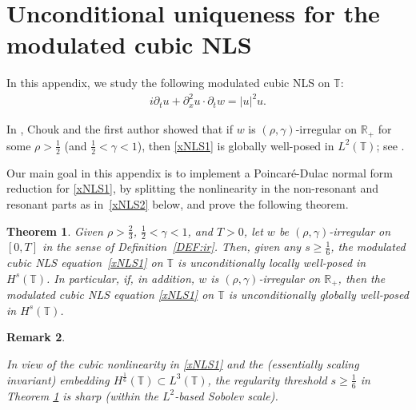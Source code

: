 \documentclass[letterpaper, 11pt,  reqno]{amsart}
\newtheorem{theorem}{Theorem} [section]
\newtheorem{remark}[theorem]{Remark}
\newcommand{\1}{\hspace{0.5mm}\text{I}\hspace{0.5mm}}
\newcommand{\noi}{\noindent}
\newcommand{\R}{\mathbb{R}}
\newcommand{\T}{\mathbb{T}}
\newcommand{\g}{\gamma}
\newcommand{\dx}{\partial_x}
\newcommand{\dt}{\partial_t}
\numberwithin{equation}{section}
\numberwithin{theorem}{section}
\begin{document}
\appendix

\section{Unconditional uniqueness for the  modulated cubic NLS} 
\label{SEC:A}

In this appendix, we study  the 
 following modulated cubic NLS on $\T$:
\begin{align}
i \dt u + \dx^2 u \cdot \dt w= |u|^2u.
\label{xNLS1}
\end{align}


\noi
In \cite{CG1},
Chouk and the first author showed that 
if   $w$ is $(\rho,\g)$-irregular on $\R_+$
for some $\rho > \frac 12 $ (and $\frac 12 < \g < 1$), 
then \eqref{xNLS1} is  globally well-posed
in $L^2(\T)$; see \cite[Theorem~1.8]{CG1}.


Our main goal in this appendix is to 
implement a Poincar\'e-Dulac normal form reduction for \eqref{xNLS1}, 
by splitting the nonlinearity in the non-resonant and resonant parts as in~\eqref{xNLS2} below, 
and prove the following theorem.

\begin{theorem}\label{THM:UU4}
Given $\rho > \frac 23$,  $\frac12< \g < 1$, and $T> 0$, 
let  $w$ be $(\rho,\g)$-irregular on $[0, T]$ in the sense of Definition~\ref{DEF:ir}.
Then, 
given any    $s\ge \frac 16$, 
the modulated cubic NLS equation~\eqref{xNLS1}
on  $\T$
is unconditionally locally well-posed in $H^s(\T)$.
In particular, 
if, in addition, $w$ is  $(\rho,\g)$-irregular  on $\R_+$, 
then the modulated cubic NLS equation \eqref{xNLS1}
on  $\T$
is unconditionally globally well-posed in $H^s(\T)$.

\end{theorem}


\begin{remark}\label{REM:sharp2} \rm

	
In view of  the cubic nonlinearity in \eqref{xNLS1}
and the (essentially scaling invariant) embedding $H^\frac 16 (\T)\subset L^3(\T)$, 
the regularity threshold $s \ge \frac 16$ 
in Theorem \ref{THM:UU4} 
is sharp
(within the $L^2$-based Sobolev scale). 
\end{remark}

\end{document}
